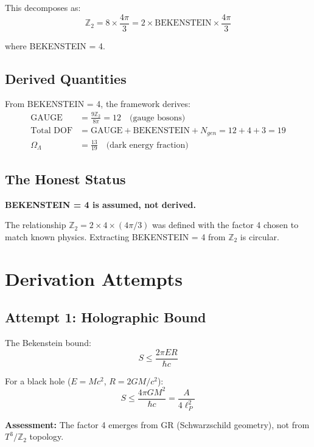 \documentclass[12pt,a4paper]{article}
\begin{document}
This decomposes as:
\begin{equation}
\mathbb{Z}_2 = 8 \times \frac{4\pi}{3} = 2 \times \text{BEKENSTEIN} \times \frac{4\pi}{3}
\end{equation}

where BEKENSTEIN = 4.

\subsection{Derived Quantities}

From BEKENSTEIN = 4, the framework derives:
\begin{align}
\text{GAUGE} &= \frac{9\mathbb{Z}_2}{8\pi} = 12 \quad \text{(gauge bosons)} \\
\text{Total DOF} &= \text{GAUGE} + \text{BEKENSTEIN} + N_{gen} = 12 + 4 + 3 = 19 \\
\Omega_\Lambda &= \frac{13}{19} \quad \text{(dark energy fraction)}
\end{align}

\subsection{The Honest Status}

\textbf{BEKENSTEIN = 4 is assumed, not derived.}

The relationship $\mathbb{Z}_2 = 2 \times 4 \times (4\pi/3)$ was defined with the factor 4 chosen to match known physics. Extracting BEKENSTEIN = 4 from $\mathbb{Z}_2$ is circular.

\section{Derivation Attempts}

\subsection{Attempt 1: Holographic Bound}

The Bekenstein bound:
\begin{equation}
S \leq \frac{2\pi E R}{\hbar c}
\end{equation}

For a black hole ($E = Mc^2$, $R = 2GM/c^2$):
\begin{equation}
S \leq \frac{4\pi G M^2}{\hbar c} = \frac{A}{4\ell_P^2}
\end{equation}

\textbf{Assessment:} The factor 4 emerges from GR (Schwarzschild geometry), not from $T^3/\mathbb{Z}_2$ topology.
\end{document}
